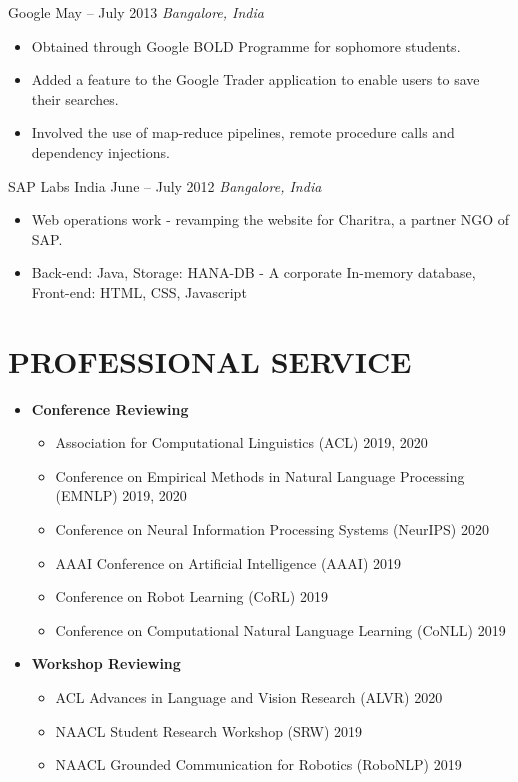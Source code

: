 \documentclass[letterpaper,10pt]{resume}
\begin{document}
{\begin{itemize}
   \credential
      {Google} {May -- July 2013}
      {\textit{Bangalore, India}} {}
      {
		\small \begin{itemize}
			\item{Obtained through Google BOLD Programme for sophomore students.}
			\item{Added a feature to the Google Trader application to enable users to save their searches.}
			\item{Involved the use of map-reduce pipelines, remote procedure calls and dependency injections.}
		\end{itemize}		      
      }
  \vspace{0.2cm}
      
  \credential
      {SAP Labs India} {June -- July 2012}
      {\textit{Bangalore, India}} {}
      {
		\small \begin{itemize}
			\item{Web operations work - revamping the website for Charitra, a partner NGO of SAP.}
			\item{Back-end: Java, Storage: HANA-DB - A corporate In-memory database, Front-end: HTML, CSS, Javascript}
		\end{itemize}		      
      }
         \vspace{0.2cm}
\end{itemize}

\section{PROFESSIONAL SERVICE}
\begin{itemize}
\item \textbf{Conference Reviewing}
\begin{itemize}
\item Association for Computational Linguistics (ACL) 2019, 2020
\item Conference on Empirical Methods in Natural Language Processing (EMNLP) 2019, 2020
\item Conference on Neural Information Processing Systems (NeurIPS) 2020
\item AAAI Conference on Artificial Intelligence (AAAI) 2019
\item Conference on Robot Learning (CoRL) 2019
\item Conference on Computational Natural Language Learning (CoNLL) 2019
\end{itemize}
\item \textbf{Workshop Reviewing}
\begin{itemize}
\item ACL Advances in Language and Vision Research (ALVR) 2020
\item NAACL Student Research Workshop (SRW) 2019
\item NAACL Grounded Communication for Robotics (RoboNLP) 2019
\end{itemize}
\end{itemize}
\vspace{0.2cm}

}
\end{document}
